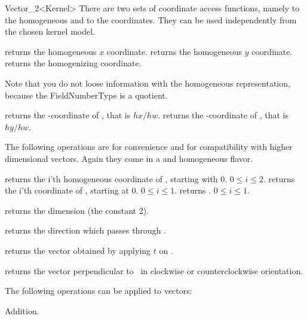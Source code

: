 \begin{ccRefClass} {Vector_2<Kernel>}
There are two sets of coordinate access functions, namely to the
homogeneous and to the  coordinates. They can be used
independently from the chosen kernel model.

       {returns the homogeneous $x$ coordinate.}
\ccGlue
{}
       {returns the homogeneous $y$ coordinate.}
\ccGlue
{}
       {returns the homogenizing  coordinate.}

Note that you do not loose information with the homogeneous
representation, because the FieldNumberType is a quotient.

       {returns the -coordinate of \ccVar, that is $hx/hw$.}
\ccGlue
{}
       {returns the -coordinate of \ccVar, that is $hy/hw$.}
       
The following operations are for convenience and for compatibility
with higher dimensional vectors.  Again they come in a
 and homogeneous flavor.

       {returns the i'th homogeneous coordinate of \ccVar, starting with 0.
        \ccPrecond $0\leq i \leq 2$.}
\ccGlue
{}
       {returns the i'th  coordinate of \ccVar, starting at 0.
        \ccPrecond $0\leq i \leq 1$.}
\ccGlue
{}
       {returns  .
        \ccPrecond $0\leq i \leq 1$.}

       {returns the dimension (the constant 2).}

       {returns the direction which passes through \ccVar.}

       {returns the vector obtained by applying $t$ on \ccVar.}

       {returns the vector perpendicular to \ccVar\ in clockwise or
        counterclockwise orientation.}


The following operations can be applied to vectors:

       {Addition.}


\end{ccRefClass}
